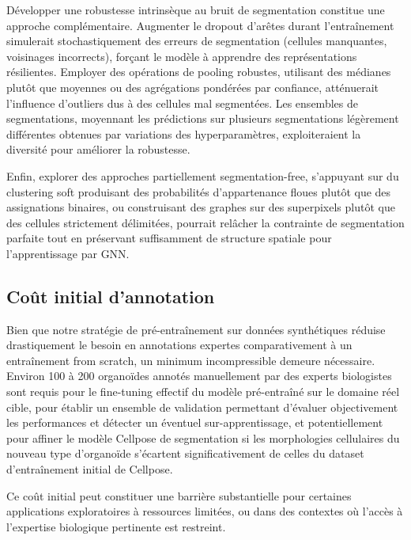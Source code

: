 Développer une robustesse intrinsèque au bruit de segmentation constitue une approche complémentaire. Augmenter le dropout d'arêtes durant l'entraînement simulerait stochastiquement des erreurs de segmentation (cellules manquantes, voisinages incorrects), forçant le modèle à apprendre des représentations résilientes. Employer des opérations de pooling robustes, utilisant des médianes plutôt que moyennes ou des agrégations pondérées par confiance, atténuerait l'influence d'outliers dus à des cellules mal segmentées. Les ensembles de segmentations, moyennant les prédictions sur plusieurs segmentations légèrement différentes obtenues par variations des hyperparamètres, exploiteraient la diversité pour améliorer la robustesse.

Enfin, explorer des approches partiellement segmentation-free, s'appuyant sur du clustering soft produisant des probabilités d'appartenance floues plutôt que des assignations binaires, ou construisant des graphes sur des superpixels plutôt que des cellules strictement délimitées, pourrait relâcher la contrainte de segmentation parfaite tout en préservant suffisamment de structure spatiale pour l'apprentissage par GNN.

\subsection{Coût initial d'annotation}

Bien que notre stratégie de pré-entraînement sur données synthétiques réduise drastiquement le besoin en annotations expertes comparativement à un entraînement from scratch, un minimum incompressible demeure nécessaire. Environ 100 à 200 organoïdes annotés manuellement par des experts biologistes sont requis pour le fine-tuning effectif du modèle pré-entraîné sur le domaine réel cible, pour établir un ensemble de validation permettant d'évaluer objectivement les performances et détecter un éventuel sur-apprentissage, et potentiellement pour affiner le modèle Cellpose de segmentation si les morphologies cellulaires du nouveau type d'organoïde s'écartent significativement de celles du dataset d'entraînement initial de Cellpose. 

Ce coût initial peut constituer une barrière substantielle pour certaines applications exploratoires à ressources limitées, ou dans des contextes où l'accès à l'expertise biologique pertinente est restreint.

